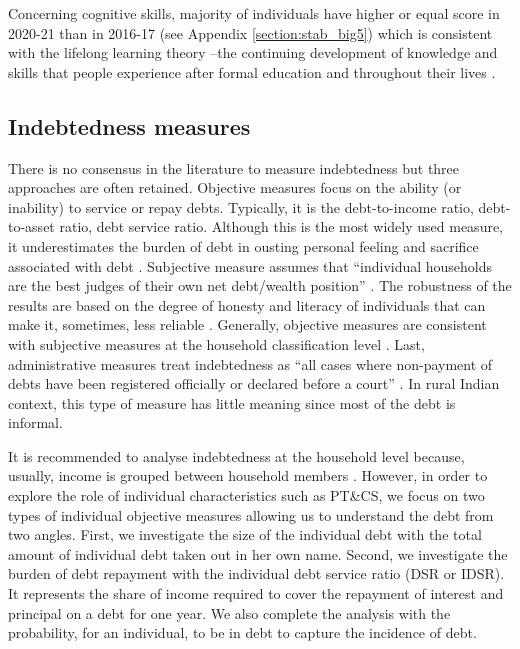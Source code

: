 \documentclass[a4paper, 12pt, onecolumn]{article}
\newcommand{\PTCS}{PT\&CS}
\begin{document}
Concerning cognitive skills, majority of individuals have higher or equal score in 2020-21 than in 2016-17 (see Appendix \ref{section:stab_big5}) which is consistent with the lifelong learning theory --the continuing development of knowledge and skills that people experience after formal education and throughout their lives \citep{London2011}.


	\subsection{Indebtedness measures}

There is no consensus in the literature to measure indebtedness but three approaches are often retained.
Objective measures focus on the ability (or inability) to service or repay debts.
Typically, it is the debt-to-income ratio, debt-to-asset ratio, debt service ratio.
Although this is the most widely used measure, it underestimates the burden of debt in ousting personal feeling and sacrifice associated with debt \citep{Betti2007}.
Subjective measure assumes that ``individual households are the best judges of their own net debt/wealth position'' \citep{Betti2007}.
The robustness of the results are based on the degree of honesty and literacy of individuals that can make it, sometimes, less reliable \citep{DAlessio2013}.
Generally, objective measures are consistent with subjective measures at the household classification level \citep{Rinaldi2006, Keese2012}.
Last, administrative measures treat indebtedness  as ``all cases where non-payment of debts have been registered officially or declared before a court'' \citep{Betti2007}.
In rural Indian context, this type of measure has little meaning since most of the debt is informal.


It is recommended to analyse indebtedness at the household level because, usually, income is grouped between household members \citep{European2010}.
However, in order to explore the role of individual characteristics such as \PTCS, we focus on two types of individual objective measures allowing us to understand the debt from two angles.
First, we investigate the size of the individual debt with the total amount of individual debt taken out in her own name.
Second, we investigate the burden of debt repayment with the individual debt service ratio (DSR or IDSR).
It represents the share of income required to cover the repayment of interest and principal on a debt for one year.
We also complete the analysis with the probability, for an individual, to be in debt to capture the incidence of debt.
\end{document}

